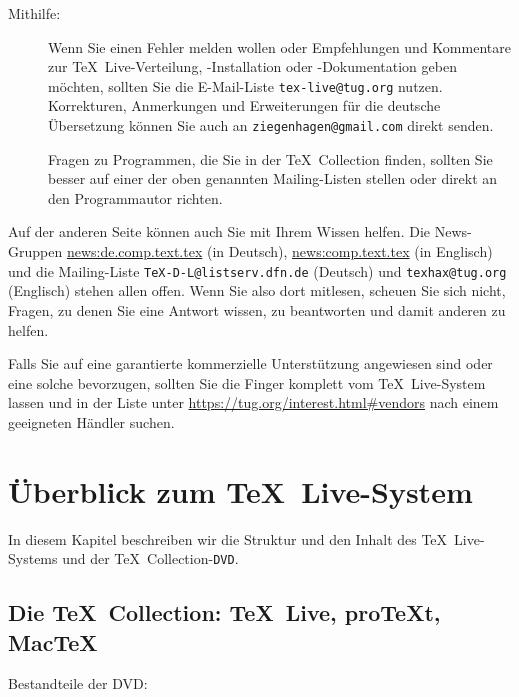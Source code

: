 \documentclass[12pt,ngerman,a4paper,fullparskip]{report}
\newcommand{\TL}{\TeX\ Live\xspace}
\newcommand{\email}[1]{\texttt{#1}}
\newcommand{\acro}[1]{\texttt{#1}}
\def\TK{\TeX\ Collection}
\providecommand*{\DVD}{\acro{DVD}\xspace}
\begin{document}
\begin{description}
\item [Mithilfe:]
      Wenn Sie einen Fehler melden wollen oder Empfehlungen und Kommentare
      zur \TL-Verteilung, -Installation oder -Dokumentation geben möchten, sollten Sie die
      E-Mail-Liste \email{tex-live@tug.org} nutzen. 
      Korrekturen, Anmerkungen und Erweiterungen für die deutsche Übersetzung können Sie auch
      an \email{ziegenhagen@gmail.com} direkt senden.

      Fragen zu Programmen, die Sie in der {\TK} finden, sollten Sie besser auf
      einer der oben genannten Mailing-Listen stellen oder direkt an den Programmautor
      richten.
\end{description}

\noindent Auf der anderen Seite können auch Sie mit Ihrem Wissen helfen. Die News-Gruppen
\url{news:de.comp.text.tex} (in Deutsch), \url{news:comp.text.tex} (in Englisch) und
die Mailing-Liste \email{TeX-D-L@listserv.dfn.de} (Deutsch) und \email{texhax@tug.org} (Englisch)
stehen allen offen. Wenn Sie also dort mitlesen, scheuen Sie sich nicht, Fragen,
zu denen Sie eine Antwort wissen, zu beantworten und damit anderen zu helfen.

Falls Sie auf eine garantierte kommerzielle Unterstützung angewiesen sind oder eine solche
bevorzugen, sollten Sie die Finger komplett vom \TL-System lassen und in der Liste unter \url{https://tug.org/interest.html#vendors} nach einem geeigneten Händler suchen.

\chapter{Überblick zum \TL-System}\label{sec:overview-tl}

In diesem Kapitel beschreiben wir die Struktur und den Inhalt des \TL-Systems und der \TK-\DVD.

\section[Die \protect\TeX\protect\ Collection: \TL, pro\TeX{}t, Mac\TeX]{Die \protect\TeX\protect\ Collection: \TL, pro\TeX{}t, Mac\TeX}\label{sec:tl-coll-dists}

Bestandteile der DVD:
\end{document}
